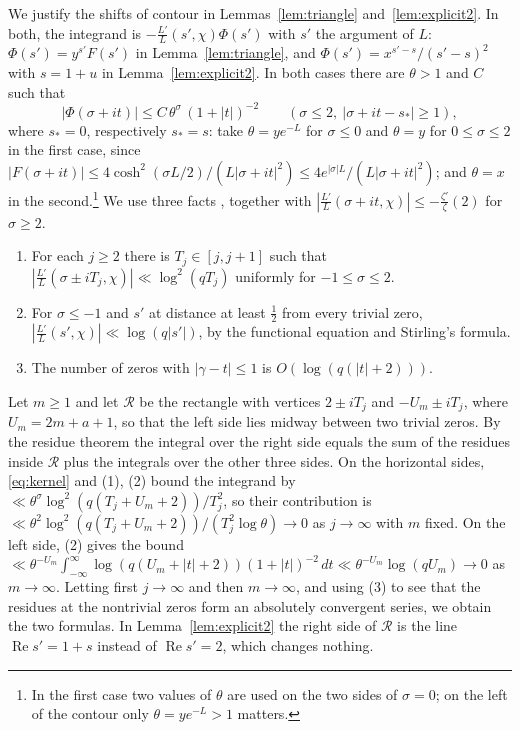 \documentclass[11pt]{amsart}
\theoremstyle{definition}
\theoremstyle{remark}
\numberwithin{equation}{section}
\renewcommand{\Re}{\operatorname{Re}}
\begin{document}
We justify the shifts of contour in Lemmas~\ref{lem:triangle} and~\ref{lem:explicit2}. In both, the integrand is $-\frac{L'}{L}(s',\chi)\Phi(s')$ with $s'$ the argument of $L$: $\Phi(s')=y^{s'}F(s')$ in Lemma~\ref{lem:triangle}, and $\Phi(s')=x^{s'-s}/(s'-s)^2$ with $s=1+u$ in Lemma~\ref{lem:explicit2}. In both cases there are $\theta>1$ and $C$ such that
\begin{equation}\label{eq:kernel}
|\Phi(\sigma+it)|\le C\,\theta^{\sigma}\,(1+|t|)^{-2}\qquad(\sigma\le2,\ |\sigma+it-s_*|\ge1),
\end{equation}
where $s_*=0$, respectively $s_*=s$: take $\theta=ye^{-L}$ for $\sigma\le0$ and $\theta=y$ for $0\le\sigma\le2$ in the first case, since $|F(\sigma+it)|\le4\cosh^2(\sigma L/2)/(L|\sigma+it|^2)\le 4e^{|\sigma|L}/(L|\sigma+it|^2)$; and $\theta=x$ in the second.\footnote{In the first case two values of $\theta$ are used on the two sides of $\sigma=0$; on the left of the contour only $\theta=ye^{-L}>1$ matters.} We use three facts \cite[Chapters 12, 16, 17 and 19]{Dav80}, together with $|\frac{L'}{L}(\sigma+it,\chi)|\le-\frac{\zeta'}{\zeta}(2)$ for $\sigma\ge2$.
\begin{enumerate}[label=(\arabic*)]
\item For each $j\ge2$ there is $T_j\in[j,j+1]$ such that $|\frac{L'}{L}(\sigma\pm iT_j,\chi)|\ll\log^2(qT_j)$ uniformly for $-1\le\sigma\le2$.
\item For $\sigma\le-1$ and $s'$ at distance at least $\tfrac12$ from every trivial zero, $|\frac{L'}{L}(s',\chi)|\ll\log(q|s'|)$, by the functional equation and Stirling's formula.
\item The number of zeros with $|\gamma-t|\le1$ is $O(\log(q(|t|+2)))$.
\end{enumerate}
Let $m\ge1$ and let $\mathcal R$ be the rectangle with vertices $2\pm iT_j$ and $-U_m\pm iT_j$, where $U_m=2m+a+1$, so that the left side lies midway between two trivial zeros. By the residue theorem the integral over the right side equals the sum of the residues inside $\mathcal R$ plus the integrals over the other three sides. On the horizontal sides, \eqref{eq:kernel} and (1), (2) bound the integrand by $\ll\theta^{\sigma}\log^2(q(T_j+U_m+2))/T_j^2$, so their contribution is $\ll\theta^2\log^2(q(T_j+U_m+2))/(T_j^2\log\theta)\to0$ as $j\to\infty$ with $m$ fixed. On the left side, (2) gives the bound $\ll\theta^{-U_m}\int_{-\infty}^{\infty}\log(q(U_m+|t|+2))(1+|t|)^{-2}\,dt\ll\theta^{-U_m}\log(qU_m)\to0$ as $m\to\infty$. Letting first $j\to\infty$ and then $m\to\infty$, and using (3) to see that the residues at the nontrivial zeros form an absolutely convergent series, we obtain the two formulas. In Lemma~\ref{lem:explicit2} the right side of $\mathcal R$ is the line $\Re s'=1+s$ instead of $\Re s'=2$, which changes nothing.
\end{document}
